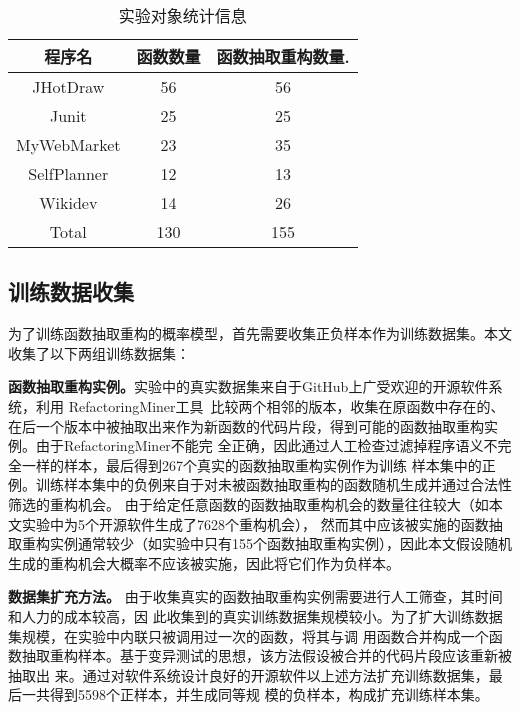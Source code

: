 \begin{table}[!t]
  \scriptsize
  \renewcommand{\arraystretch}{1.3}
  \caption{实验对象统计信息}
  \label{benchmark}
  \centering
  \begin{tabular}{ccc}
  \toprule 
  程序名 &函数数量 &函数抽取重构数量.\\ \midrule
  JHotDraw &56 &56 \\ 
  Junit &25 &25 \\ 
  MyWebMarket &23 &35 \\ 
  SelfPlanner &12 &13 \\ 
  Wikidev &14 &26 \\ \midrule
  Total &130 &155 \\ 
  \bottomrule
  \end{tabular}
  \end{table}

\subsection{训练数据收集}
为了训练函数抽取重构的概率模型，首先需要收集正负样本作为训练数据集。本文收集了以下两组训练数据集：

\textbf{函数抽取重构实例。}实验中的真实数据集来自于GitHub上广受欢迎的开源软件系统，利用
RefactoringMiner工具~\cite{tsantalis2013multidimensional}比较两个相邻的版本，收集在原函数中存在的、
在后一个版本中被抽取出来作为新函数的代码片段，得到可能的函数抽取重构实例。由于RefactoringMiner不能完
全正确，因此通过人工检查过滤掉程序语义不完全一样的样本，最后得到267个真实的函数抽取重构实例作为训练
样本集中的正例。训练样本集中的负例来自于对未被函数抽取重构的函数随机生成并通过合法性筛选的重构机会。
由于给定任意函数的函数抽取重构机会的数量往往较大（如本文实验中为5个开源软件生成了7628个重构机会），
然而其中应该被实施的函数抽取重构实例通常较少（如实验中只有155个函数抽取重构实例），因此本文假设随机
生成的重构机会大概率不应该被实施，因此将它们作为负样本。

\textbf{数据集扩充方法。} 由于收集真实的函数抽取重构实例需要进行人工筛查，其时间和人力的成本较高，因
此收集到的真实训练数据集规模较小。为了扩大训练数据集规模，在实验中内联只被调用过一次的函数，将其与调
用函数合并构成一个函数抽取重构样本。基于变异测试的思想，该方法假设被合并的代码片段应该重新被抽取出
来。通过对软件系统设计良好的开源软件以上述方法扩充训练数据集，最后一共得到5598个正样本，并生成同等规
模的负样本，构成扩充训练样本集。
  
